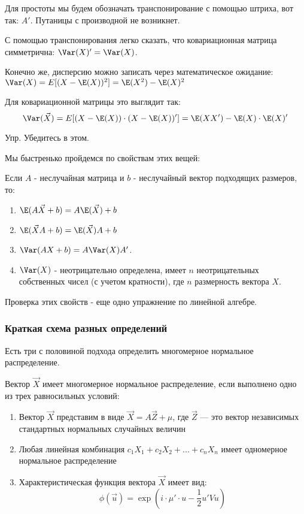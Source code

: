 Для простоты мы будем обозначать транспонирование с помощью штриха, вот так: $A'$. Путаницы с производной не возникнет.

С помощью транспонирования легко сказать, что ковариационная матрица симметрична: $\Var(X)'=\Var(X)$.

Конечно же, дисперсию можно записать через математическое ожидание: $\Var(X)=E[(X-\E(X))^{2}]=\E(X^{2})-\E(X)^{2}$

Для ковариационной матрицы это выглядит так:
\begin{equation}
\Var(\vec{X})=E[(X-\E(X))\cdot (X-\E(X))']=\E(XX')-\E(X)\cdot \E(X)'
\end{equation}

Упр. Убедитесь в этом.


Мы быстренько пройдемся по свойствам этих вещей:

Если $A$ - неслучайная матрица и $b$ - неслучайный вектор подходящих размеров, то:
\begin{enumerate}
\item $\E(A\vec{X}+b)=A\E(\vec{X})+b$
\item $\E(\vec{X}A+b)=\E(\vec{X})A+b$
\item $\Var(AX+b)=A\Var(X)A'$.
\item $\Var(X)$ - неотрицательно определена, имеет $n$ неотрицательных собственных чисел (с учетом кратности), где $n$ размерность вектора $X$.
\end{enumerate}

Проверка этих свойств - еще одно упражнение по линейной алгебре.


\subsubsection*{Краткая схема разных определений}

Есть три с половиной подхода определить многомерное нормальное распределение.

Вектор $\vec{X}$ имеет многомерное нормальное распределение, если выполнено одно из трех равносильных условий:
\begin{enumerate}
\item Вектор $\vec{X}$ представим в виде $\vec{X}=A\vec{Z}+\mu$, где $\vec{Z}$ --- это вектор независимых стандартных нормальных случайных величин
\item Любая линейная комбинация $c_{1}X_{1}+c_{2}X_{2}+...+c_{n}X_{n}$ имеет одномерное нормальное распределение
\item Характеристическая функция вектора $\vec{X}$ имеет вид:
\begin{equation}
\phi(\vec{u})=\exp\left(i\cdot \mu'\cdot u-\frac{1}{2}u'Vu \right)
\end{equation}
\end{enumerate}

